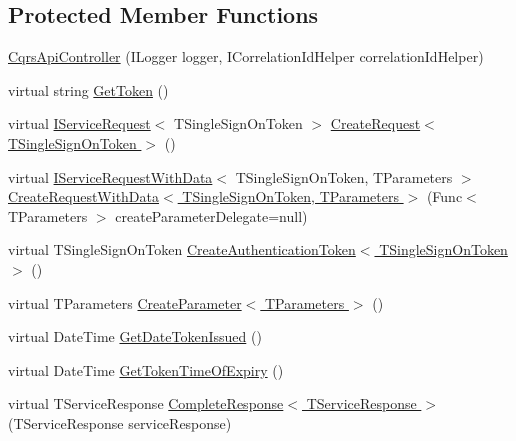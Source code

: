 \subsection*{Protected Member Functions}
\begin{DoxyCompactItemize}
\item 
\hyperlink{classCqrs_1_1WebApi_1_1CqrsApiController_a83125cca7cbb61ac890d3a4115db2bdf_a83125cca7cbb61ac890d3a4115db2bdf}{Cqrs\+Api\+Controller} (I\+Logger logger, I\+Correlation\+Id\+Helper correlation\+Id\+Helper)
\item 
virtual string \hyperlink{classCqrs_1_1WebApi_1_1CqrsApiController_ab60b18a6ae594ed4691713c00264e1ee_ab60b18a6ae594ed4691713c00264e1ee}{Get\+Token} ()
\item 
virtual \hyperlink{interfaceCqrs_1_1Services_1_1IServiceRequest}{I\+Service\+Request}$<$ T\+Single\+Sign\+On\+Token $>$ \hyperlink{classCqrs_1_1WebApi_1_1CqrsApiController_ad24653d9e31cfb74e7cda44a70ad022e_ad24653d9e31cfb74e7cda44a70ad022e}{Create\+Request$<$ T\+Single\+Sign\+On\+Token $>$} ()
\item 
virtual \hyperlink{interfaceCqrs_1_1Services_1_1IServiceRequestWithData}{I\+Service\+Request\+With\+Data}$<$ T\+Single\+Sign\+On\+Token, T\+Parameters $>$ \hyperlink{classCqrs_1_1WebApi_1_1CqrsApiController_a3fe6d3685d8dff1e44d0310540527b0e_a3fe6d3685d8dff1e44d0310540527b0e}{Create\+Request\+With\+Data$<$ T\+Single\+Sign\+On\+Token, T\+Parameters $>$} (Func$<$ T\+Parameters $>$ create\+Parameter\+Delegate=null)
\item 
virtual T\+Single\+Sign\+On\+Token \hyperlink{classCqrs_1_1WebApi_1_1CqrsApiController_af27a5ca72991c6fd2e50907cb032dd2b_af27a5ca72991c6fd2e50907cb032dd2b}{Create\+Authentication\+Token$<$ T\+Single\+Sign\+On\+Token $>$} ()
\item 
virtual T\+Parameters \hyperlink{classCqrs_1_1WebApi_1_1CqrsApiController_a157e6f8a2f1ec94decfc8c96f74962a2_a157e6f8a2f1ec94decfc8c96f74962a2}{Create\+Parameter$<$ T\+Parameters $>$} ()
\item 
virtual Date\+Time \hyperlink{classCqrs_1_1WebApi_1_1CqrsApiController_abc17886f0ecd2a44d487ed88766ee174_abc17886f0ecd2a44d487ed88766ee174}{Get\+Date\+Token\+Issued} ()
\item 
virtual Date\+Time \hyperlink{classCqrs_1_1WebApi_1_1CqrsApiController_a382c452313c3492ef7c73865e03902b2_a382c452313c3492ef7c73865e03902b2}{Get\+Token\+Time\+Of\+Expiry} ()
\item 
virtual T\+Service\+Response \hyperlink{classCqrs_1_1WebApi_1_1CqrsApiController_add369c5b7779bc8d69c47bcc564ac086_add369c5b7779bc8d69c47bcc564ac086}{Complete\+Response$<$ T\+Service\+Response $>$} (T\+Service\+Response service\+Response)
\end{DoxyCompactItemize}
